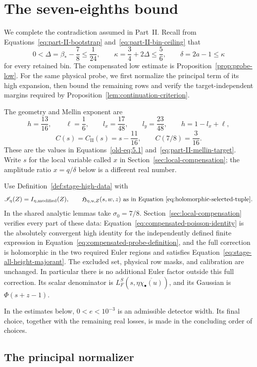 \section{The seven-eighths bound}\label{sec:conclusion}

We complete the contradiction assumed in Part~II.  Recall from
Equations~\eqref{eq:part-II-bootstrap} and~\eqref{eq:part-II-bin-ceiling}
that
\[
 0<\Delta=\beta_*-\frac78\le\frac1{24},\qquad
 \kappa=\frac34+2\Delta\le\frac56,\qquad
 \delta=2a-1\le\kappa
\]
for every retained bin.  The compensated low estimate is
Proposition~\ref{prop:probe-low}. For the same physical probe, we first
normalize the principal term of its high expansion, then bound the remaining
rows and verify the target-independent margins required by
Proposition~\ref{lem:continuation-criterion}.

The geometry and Mellin exponent are
\[
 h=\frac{13}{16},\qquad \ell=\frac16,\qquad
 l_x=\frac{17}{48},\qquad l_y=\frac{23}{48},\qquad
 h=1-l_x+\ell,
\]
\[
 C(s)=C_{\mathrm{II}}(s)=s-\frac{11}{16},
 \qquad C(7/8)=\frac3{16}.
\]
These are the values in Equations~\eqref{old-eq:5.1}
and~\eqref{eq:part-II-mellin-target}.  Write \(s\) for the local variable
called \(x\) in Section~\ref{sec:local-compensation}; the amplitude ratio
\(x=q/\delta\) below is a different real number.

Use Definition~\ref{def:stage-high-data} with
\[
 \mathscr I_\eta(Z)=I_{\eta,\mathrm{modified}}(Z),\qquad
 \mathfrak H_{\eta,u,Z}(s,w,z)
     \ \text{as in Equation~\eqref{eq:holomorphic-selected-tuple}}.
\]
In the shared analytic lemmas take \(\sigma_0=7/8\).
Section~\ref{sec:local-compensation} verifies every part of these data:
Equation~\eqref{eq:compensated-poisson-identity} is the absolutely
convergent high identity for the independently defined finite expression
in Equation~\eqref{eq:compensated-probe-definition}, and the full
correction is holomorphic in the two required Euler regions and satisfies
Equation~\eqref{eq:stage-all-height-majorant}.  The excluded set, physical
row masks, and calibration are unchanged.  In particular there is no
additional Euler factor outside this full correction.  Its scalar
denominator is \(L_F^S(s,\eta\overline{\chi_\bullet(u)})\), and its
Gaussian is \(\Phi(s+z-1)\).

In the estimates below, \(0<e<10^{-3}\) is an admissible detector width.
Its final choice, together with the remaining real losses, is made in
the concluding order of choices.

\subsection{The principal normalizer}\label{sec:principal-signal}

